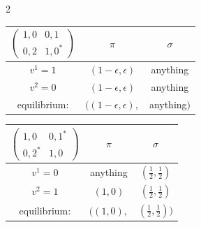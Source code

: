 \documentclass[12pt]{article}
\begin{document}
\begin{multicols}{2}
    \begin{center}
        \begin{tabular}{c|c c}
            $\begin{pmatrix}
                1, 0 & 0, 1 \\
                0, 2 & 1, 0^\ast
            \end{pmatrix}$ & $\pi$ & $\sigma$ \\ \hline
            $v^1 = 1$ & $(1 - \epsilon, \epsilon)$ & anything \\
            $v^2 = 0$ & $(1 - \epsilon, \epsilon)$ & anything \\
            equilibrium: & $((1 - \epsilon, \epsilon),$ & anything$)$
        \end{tabular}
    \end{center}

    \begin{center}
        \begin{tabular}{c|c c}
            $\begin{pmatrix}
                1, 0 & 0, 1^\ast \\
                0, 2^\ast & 1, 0
            \end{pmatrix}$ & $\pi$ & $\sigma$ \\ \hline
            $v^1 = 0$ & anything & $\left( \frac{1}{2}, \frac{1}{2} \right)$ \\
            $v^2 = 1$ & $(1, 0)$ & $\left( \frac{1}{2}, \frac{1}{2} \right)$ \\
            equilibrium: & $((1, 0),$ & $\left( \frac{1}{2}, \frac{1}{2} \right))$
        \end{tabular}
    \end{center}
\end{multicols}
\end{document}
